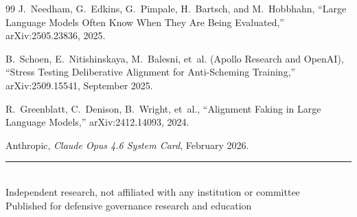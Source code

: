 \documentclass[11pt,letterpaper]{article}
\begin{document}
\begin{thebibliography}{99}
J.~Needham, G.~Edkins, G.~Pimpale, H.~Bartsch, and M.~Hobbhahn, ``Large Language Models Often Know When They Are Being Evaluated,'' arXiv:2505.23836, 2025.

B.~Schoen, E.~Nitishinskaya, M.~Balesni, et~al. (Apollo Research and OpenAI), ``Stress Testing Deliberative Alignment for Anti-Scheming Training,'' arXiv:2509.15541, September 2025.

R.~Greenblatt, C.~Denison, B.~Wright, et~al., ``Alignment Faking in Large Language Models,'' arXiv:2412.14093, 2024.

Anthropic, \textit{Claude Opus 4.6 System Card}, February 2026.

\end{thebibliography}


\vfill
\begin{center}
\small\color{softslate}\sffamily
\rule{0.5\textwidth}{0.4pt}\\[0.5em]
Independent research, not affiliated with any institution or committee\\
Published for defensive governance research and education
\end{center}
\end{document}
